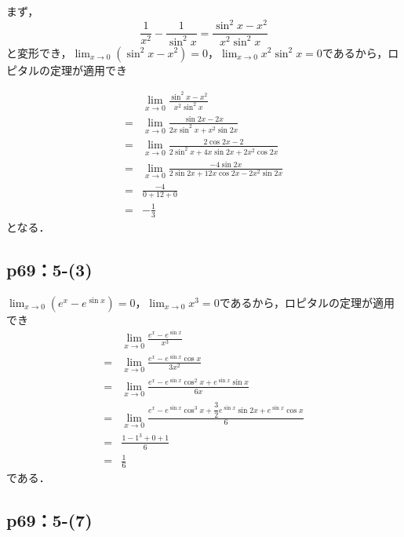 \documentclass[uplatex,dvipdfmx,a4paper,10pt,fleqn]{jsarticle}
\newenvironment{tleftbar}{\begin{tbleftline}\setlength{\parindent}{1zw}}{\end{tbleftline}}
\begin{document}
    \begin{tleftbar}
        まず，
        \[
            \frac{1}{x^2}-\frac{1}{\sin ^2 x} = \frac{\sin ^2 x-x^2}{x^2 \sin ^2 x}
        \]
        と変形でき，$\lim_{x \to 0} (\sin ^2 x-x^2)=0$，$\lim_{x \to 0} x^2 \sin ^2 x=0$であるから，ロピタルの定理が適用でき

        \begin{align*} 
            &\lim_{x \to 0} \frac{\sin ^2 x - x^2}{x^2 \sin ^2 x} \\
            =&\lim_{x \to 0} \frac{\sin 2x - 2x}{2x \sin ^2 x + x^2 \sin 2 x} \\
            =& \lim_{x \to 0} \frac{2\cos 2x -2}{2 \sin ^2 x + 4x \sin 2x +2x^2 \cos 2x} \\
            =& \lim_{x \to 0} \frac{-4\sin 2x}{2\sin 2x + 12x\cos 2x  -2x^2 \sin 2x } \\
            =& \frac{-4}{0+12+0} \\
            =& -\frac{1}{3}
        \end{align*} 
        となる．
    \end{tleftbar}


    \subsection*{p69：5-(3)}

    \begin{tleftbar}
        $\lim_{x \to 0} (e^x - e^{\sin x})=0$，$\lim_{x \to 0} x^3 =0$であるから，ロピタルの定理が適用でき
        \begin{align*} 
            & \lim_{x \to 0} \frac{e^x - e^{\sin x}}{x^3} \\
            =& \lim_{x \to 0} \frac{e^x - e^{\sin x} \cos x}{3x^2} \\
            =& \lim_{x \to 0} \frac{e^x - e^{\sin x } \cos^2 x + e^{\sin x} \sin x}{6x} \\
            =& \lim_{x \to 0} \frac{e^x - e^{\sin x} \cos ^3 x +\dfrac{3}{2}e^{\sin x} \sin 2x  + e^{\sin x} \cos x}{6} \\
            =&\frac{1-1^3 +0 +1}{6} \\
            =&\frac{1}{6}
        \end{align*} 
        である．
    \end{tleftbar}

    \subsection*{p69：5-(7)}
\end{document}
